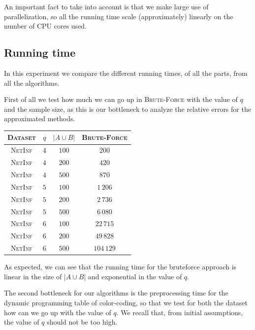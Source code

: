 An important fact to take into account is that we make large use of parallelization, 
so all the running time scale (approximately) linearly on the number of CPU cores used.

\subsection*{Running time}

In this experiment we compare the different running times, of all the parts, from all the algorithms. %
\medskip

First of all we test how much we can go up in \textsc{Brute-Force} with the value of $q$ and the sample size, as this is our bottleneck to analyze the relative errors for the approximated methods.\medskip 

\begin{table}[ht]
	\centering
	\begin{tabular}{|c|c|c|c|}
		\hline
		\textsc{Dataset} & $q$ & $|A \cup B|$ & \textsc{Brute-Force} \\ \hline \hline
		\textsc{NetInf}  & $4$ & $100$        & $200$                \\ \hline
		\textsc{NetInf}  & $4$ & $200$        & $420$                \\ \hline
		\textsc{NetInf}  & $4$ & $500$        & $870$                \\ \hline \hline
		\textsc{NetInf}  & $5$ & $100$        & $1\,206$             \\ \hline
		\textsc{NetInf}  & $5$ & $200$        & $2\,736$             \\ \hline
		\textsc{NetInf}  & $5$ & $500$        & $6\,080$             \\ \hline \hline
		\textsc{NetInf}  & $6$ & $100$        & $22\,715$            \\ \hline
		\textsc{NetInf}  & $6$ & $200$        & $49\,828$            \\ \hline
		\textsc{NetInf}  & $6$ & $500$        & $104\,129$           \\ \hline
	\end{tabular}
\end{table}

As expected, we can see that the running time for the bruteforce approach is linear in the size of $|A \cup B|$ and exponential in the value of $q$.\medskip

The second bottleneck for our algorithms is the preprocessing time for the dynamic programming table of color-coding, so that we test for both the dataset how can we go up with the value of $q$. We recall that, from initial assumptions, the value of $q$ should not be too high. 

